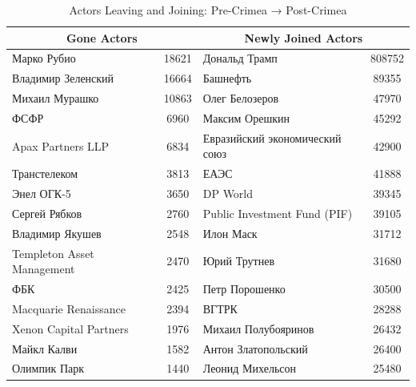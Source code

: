 \begin{table}[htbp]
\centering
\caption{Actors Leaving and Joining: Pre-Crimea → Post-Crimea}
\label{tab:actor_changes_post-crimea}
\begin{tabular}{p{6cm}cp{6cm}c}
\toprule
\multicolumn{2}{c}{Gone Actors} & \multicolumn{2}{c}{Newly Joined Actors} \\
\midrule
Марко Рубио & 18621 & Дональд Трамп & 808752 \\
Владимир Зеленский & 16664 & Башнефть & 89355 \\
Михаил Мурашко & 10863 & Олег Белозеров & 47970 \\
ФСФР & 6960 & Максим Орешкин & 45292 \\
Apax Partners LLP & 6834 & Евразийский экономический союз & 42900 \\
Транстелеком & 3813 & ЕАЭС & 41888 \\
Энел ОГК-5 & 3650 & DP World & 39345 \\
Сергей Рябков & 2760 & Public Investment Fund (PIF) & 39105 \\
Владимир Якушев & 2548 & Илон Маск & 31712 \\
Templeton Asset Management & 2470 & Юрий Трутнев & 31680 \\
ФБК & 2425 & Петр Порошенко & 30500 \\
Macquarie Renaissance & 2394 & ВГТРК & 28288 \\
Xenon Capital Partners & 1976 & Михаил Полубояринов & 26432 \\
Майкл Калви & 1582 & Антон Златопольский & 26400 \\
Олимпик Парк & 1440 & Леонид Михельсон & 25480 \\
\bottomrule
\end{tabular}
\end{table}
